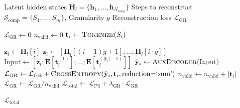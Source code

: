 \begin{algorithm}[h]
\footnotesize
\caption{Generative Reconstruction (PS-GR)}
\label{alg:gr}
\begin{algorithmic}[1]
 Latent hidden states $\mathbf{H}_l = \{\mathbf{h}_1, \ldots, \mathbf{h}_{N_{\text{total}}}\}$
 Steps to reconstruct $\mathcal{S}_{\text{comp}} = \{S_1, \ldots, S_m\}$, Granularity $g$
 Reconstruction loss $\mathcal{L}_{\text{GR}}$

\STATE $\mathcal{L}_{\text{GR}} \gets 0$
\STATE $n_{\text{valid}} \gets 0$
\STATE
{}
    \STATE $\mathbf{t}_i \gets \textsc{Tokenize}(S_i)$ 
    
    \STATE
        \STATE $\mathbf{z}_i \gets \mathbf{H}_l[i]$ 
    \ELSE
        \STATE $\mathbf{z}_i \gets [\mathbf{H}_l[(i-1)g + 1]; \ldots; \mathbf{H}_l[i \cdot g]]$ 
    \ENDIF
    \STATE
    \STATE $\text{Input} \gets [\mathbf{z}_i; \mathbf{E}[\mathbf{t}_i^{(1)}]; \ldots; \mathbf{E}[\mathbf{t}_i^{(|\mathbf{t}_i|-1)}]]$
    \STATE $\hat{\mathbf{y}}_i \gets \textsc{AuxDecoder}(\text{Input})$
    \STATE $\mathcal{L}_{\text{GR}} \gets \mathcal{L}_{\text{GR}} + \textsc{CrossEntropy}(\hat{\mathbf{y}}_i, \mathbf{t}_i, \text{reduction=`sum'})$
    \STATE $n_{\text{valid}} \gets n_{\text{valid}} + |\mathbf{t}_i|$
\ENDFOR
\STATE
\STATE $\mathcal{L}_{\text{GR}} \gets \mathcal{L}_{\text{GR}} / n_{\text{valid}}$
\STATE $\mathcal{L}_{\text{total}} \gets \mathcal{L}_{\text{PS}} + \lambda_{\text{GR}} \cdot \mathcal{L}_{\text{GR}}$

 $\mathcal{L}_{\text{total}}$
\end{algorithmic}
\end{algorithm}